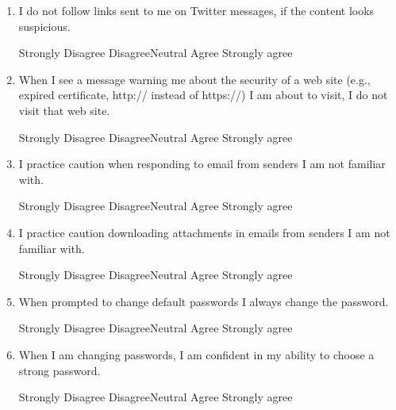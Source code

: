 \begin{enumerate}[noitemsep]
\item I do not follow links sent to me on Twitter messages, if the content looks suspicious.
\par Strongly Disagree \hspace{1cm} Disagree\hspace{1cm}Neutral\hspace{1cm} Agree\hspace{1cm} Strongly agree
\item When I see a message warning me about the security of a web site (e.g., expired certificate, http:// instead of https://) I am about to visit, I do not visit that web site.
\par Strongly Disagree \hspace{1cm} Disagree\hspace{1cm}Neutral\hspace{1cm} Agree\hspace{1cm} Strongly agree
\item I practice caution when responding to email from senders I am not familiar with.
\par Strongly Disagree \hspace{1cm} Disagree\hspace{1cm}Neutral\hspace{1cm} Agree\hspace{1cm} Strongly agree
\item I practice caution downloading attachments in emails from senders I am not familiar with.
\par Strongly Disagree \hspace{1cm} Disagree\hspace{1cm}Neutral\hspace{1cm} Agree\hspace{1cm} Strongly agree
\item When prompted to change default passwords I always change the password.
\par Strongly Disagree \hspace{1cm} Disagree\hspace{1cm}Neutral\hspace{1cm} Agree\hspace{1cm} Strongly agree
\item When I am changing passwords, I am confident in my ability to choose a strong password.
\par Strongly Disagree \hspace{1cm} Disagree\hspace{1cm}Neutral\hspace{1cm} Agree\hspace{1cm} Strongly agree

\end{enumerate}
